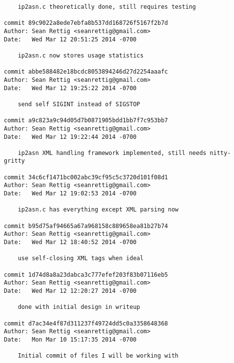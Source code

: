 \documentclass[letterpaper,10pt,fleqn]{article}
\numberwithin{equation}{section}
\begin{document}
\begin{verbatim}
    ip2asn.c theoretically done, still requires testing

commit 89c9022a8ede7ebfa8b537dd168726f5167f2b7d
Author: Sean Rettig <seanrettig@gmail.com>
Date:   Wed Mar 12 20:51:25 2014 -0700

    ip2asn.c now stores usage statistics

commit abbe588482e18bcdc8053894246d27d2254aaafc
Author: Sean Rettig <seanrettig@gmail.com>
Date:   Wed Mar 12 19:25:22 2014 -0700

    send self SIGINT instead of SIGSTOP

commit a9c823a9c94d05d7b0871905bdd1bb7f7c953bb7
Author: Sean Rettig <seanrettig@gmail.com>
Date:   Wed Mar 12 19:22:44 2014 -0700

    ip2asn XML handling framework implemented, still needs nitty-gritty

commit 34c6cf1471bc002abc39cf95c5c3720d101f08d1
Author: Sean Rettig <seanrettig@gmail.com>
Date:   Wed Mar 12 19:02:53 2014 -0700

    ip2asn.c has everything except XML parsing now

commit b95d75af94665a67a968158c889658ea81b27b74
Author: Sean Rettig <seanrettig@gmail.com>
Date:   Wed Mar 12 18:40:52 2014 -0700

    use self-closing XML tags when ideal

commit 1d74d8a8a23dabca3c777efef203f83b07116eb5
Author: Sean Rettig <seanrettig@gmail.com>
Date:   Wed Mar 12 12:20:27 2014 -0700

    done with initial design in writeup

commit d7ac34e4f87d311237f49724dd5c0a3358648368
Author: Sean Rettig <seanrettig@gmail.com>
Date:   Mon Mar 10 15:17:35 2014 -0700

    Initial commit of files I will be working with
\end{verbatim}
\end{document}
